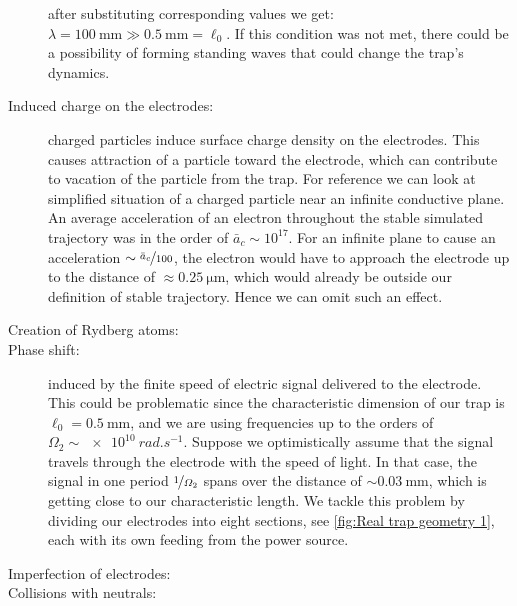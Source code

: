 \begin{description}
after substituting corresponding values we get: $\lambda = \SI{100}{\mm} \gg \SI{0.5}{\mm} = \ell_0$. If this condition was not met, there could be a possibility of forming standing waves that could change the trap's dynamics.  
	\item[Induced charge on the electrodes:] charged particles induce surface charge density on the electrodes. This causes attraction of a particle toward the electrode, which can contribute to vacation of the particle from the trap. For reference we can look at simplified situation of a charged particle near an infinite conductive plane. An average acceleration of an electron throughout the stable simulated trajectory was in the order of $\bar{a}_c \sim 10^{17}$. For an infinite plane to cause an acceleration $\sim \nicefrac{\bar{a}_c}{100}$, the electron would have to approach the electrode up to the distance of $\approx \SI{0.25}{\micro\meter}$, which would already be outside our definition of stable trajectory. Hence we can omit such an effect. 
	\item[Creation of Rydberg atoms:] 
	\item[Phase shift:] induced by the finite speed of electric signal delivered to the electrode. This could be problematic since the characteristic dimension of our trap is $\ell_0 = \SI{0.5}{\mm}$, and we are using frequencies up to the orders of $\Omega_2 \sim \SI{e10}{rad.s^{-1}}$. Suppose we optimistically assume that the signal travels through the electrode with the speed of light. In that case, the signal in one period $\nicefrac{1}{\Omega_2}$ spans over the distance of $\sim \SI{0.03}{\mm}$, which is getting close to our characteristic length. We tackle this problem by dividing our electrodes into eight sections, see \ref{fig:Real trap geometry 1}, each with its own feeding from the power source.
	\item[Imperfection of electrodes:] 	
	\item[Collisions with neutrals:] 
\end{description}	

